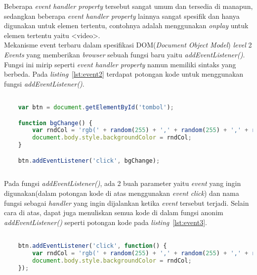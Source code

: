 Beberapa \textit{event handler property} tersebut sangat umum dan tersedia di manapun, sedangkan beberapa \textit{event handler property} lainnya sangat spesifik dan hanya digunakan untuk elemen tertentu, contohnya adalah menggunakan \textit{onplay} untuk elemen tertentu yaitu <video>.\\

Mekanisme event terbaru dalam spesifikasi DOM(\textit{Document Object Model}) \textit{level} 2 \textit{Events} yang memberikan \textit{browser} sebuah fungsi baru yaitu \textit{addEventListener()}. Fungsi ini mirip seperti \textit{event handler property} namun memiliki sintaks yang berbeda. Pada \textit{listing}~\ref{lst:event2} terdapat potongan kode untuk menggunakan fungsi \textit{addEventListener()}.

\begin{lstlisting}[language=Javascript, caption=Menggunakan fungsi \textit{addEventListener()}, label={lst:event2}]

	var btn = document.getElementById('tombol');

	function bgChange() {
  		var rndCol = 'rgb(' + random(255) + ',' + random(255) + ',' + random(255) + ')';
  		document.body.style.backgroundColor = rndCol;
	}   

	btn.addEventListener('click', bgChange);
	
\end{lstlisting}

Pada fungsi \textit{addEventListener()}, ada 2 buah parameter yaitu \textit{event} yang ingin digunakan(dalam potongan kode di atas menggunakan \textit{event click}) dan nama fungsi sebagai \textit{handler} yang ingin dijalankan ketika \textit{event} tersebut terjadi. Selain cara di atas, dapat juga menuliskan semua kode di dalam fungsi anonim \textit{addEventListener()} seperti potongan kode pada \textit{listing}~\ref{lst:event3}.

\begin{lstlisting}[language=Javascript, caption=Menuliskan kode di dalam fungsi anonim pada \textit{method addEventListener()}, label={lst:event3}]

	btn.addEventListener('click', function() {
  		var rndCol = 'rgb(' + random(255) + ',' + random(255) + ',' + random(255) + ')';
  		document.body.style.backgroundColor = rndCol;
	});
	
\end{lstlisting}

